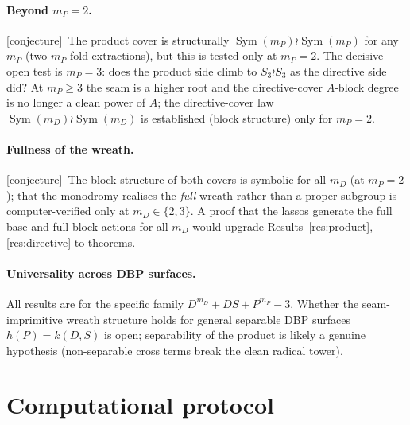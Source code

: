\documentclass[11pt]{article}
\theoremstyle{plain}
\theoremstyle{definition}
\theoremstyle{remark}
\newcommand{\Conj}{\textsf{[conjecture]}}
\newcommand{\Sym}{\operatorname{Sym}}
\begin{document}
\paragraph{Beyond $m_P=2$.}\Conj\ The product cover is structurally
$\Sym(m_P)\wr\Sym(m_P)$ for any $m_P$ (two $m_P$-fold extractions), but this is
tested only at $m_P=2$. The decisive open test is $m_P=3$: does the product side
climb to $S_3\wr S_3$ as the directive side did? At $m_P\ge3$ the seam is a higher
root and the directive-cover $A$-block degree is no longer a clean power of $A$;
the directive-cover law $\Sym(m_D)\wr\Sym(m_D)$ is established (block structure) only
for $m_P=2$.

\paragraph{Fullness of the wreath.}\Conj\ The block structure of both covers is
symbolic for all $m_D$ (at $m_P=2$); that the monodromy realises the \emph{full}
wreath rather than a proper subgroup is computer-verified only at $m_D\in\{2,3\}$.
A proof that the lassos generate the full base and full block actions for all
$m_D$ would upgrade Results~\ref{res:product},\ref{res:directive} to theorems.

\paragraph{Universality across DBP surfaces.} All results are for the specific
family $D^{m_D}+DS+P^{m_P}-3$. Whether the seam-imprimitive wreath structure holds
for general separable DBP surfaces $h(P)=k(D,S)$ is open; separability of the
product is likely a genuine hypothesis (non-separable cross terms break the clean
radical tower).

\appendix
\section{Computational protocol}
\label{sec:methods}
\end{document}
